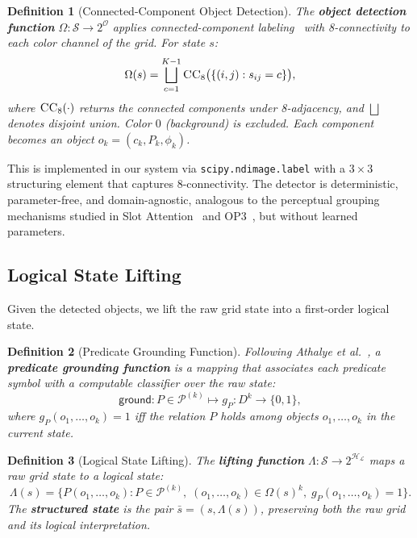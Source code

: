 \documentclass{article}
\newtheorem{definition}{Definition}
\newcommand{\calS}{\mathcal{S}}
\newcommand{\calO}{\mathcal{O}}
\newcommand{\calH}{\mathcal{H}}
\newcommand{\calL}{\mathcal{L}}
\newcommand{\calP}{\mathcal{P}}
\begin{document}
\begin{definition}[Connected-Component Object Detection]
\label{def:cc_detect}
The \textbf{object detection function} $\Omega : \calS \to 2^{\calO}$ applies connected-component labeling~\cite{he2017connected} with 8-connectivity to each color channel of the grid.  For state $s$:
\begin{equation}
\Omega(s) = \bigsqcup_{c=1}^{K-1} \textsc{CC}_8\bigl(\{(i,j) : s_{ij} = c\}\bigr),
\end{equation}
where $\textsc{CC}_8(\cdot)$ returns the connected components under 8-adjacency, and $\bigsqcup$ denotes disjoint union.  Color $0$ (background) is excluded.  Each component becomes an object $o_k = (c_k, P_k, \phi_k)$.
\end{definition}

This is implemented in our system via \texttt{scipy.ndimage.label} with a $3 \times 3$ structuring element that captures 8-connectivity.  The detector is deterministic, parameter-free, and domain-agnostic, analogous to the perceptual grouping mechanisms studied in Slot Attention~\cite{locatello2020object} and OP3~\cite{veerapaneni2020entity}, but without learned parameters.

\subsection{Logical State Lifting}
\label{sec:lifting}

Given the detected objects, we lift the raw grid state into a first-order logical state.

\begin{definition}[Predicate Grounding Function]
\label{def:predicate_grounding}
Following Athalye et al.~\cite{athalye2024pixels}, a \textbf{predicate grounding function} is a mapping that associates each predicate symbol with a computable classifier over the raw state:
\begin{equation}
\label{eq:grounding}
\mathsf{ground} : P \in \calP^{(k)} \mapsto g_P : D^k \to \{0, 1\},
\end{equation}
where $g_P(o_1, \ldots, o_k) = 1$ iff the relation $P$ holds among objects $o_1, \ldots, o_k$ in the current state.
\end{definition}

\begin{definition}[Logical State Lifting]
\label{def:lifting}
The \textbf{lifting function} $\Lambda : \calS \to 2^{\calH_\calL}$ maps a raw grid state to a logical state:
\begin{equation}
\Lambda(s) = \{ P(o_1, \ldots, o_k) : P \in \calP^{(k)},\; (o_1, \ldots, o_k) \in \Omega(s)^k,\; g_P(o_1, \ldots, o_k) = 1 \}.
\end{equation}
The \textbf{structured state} is the pair $\bar{s} = (s, \Lambda(s))$, preserving both the raw grid and its logical interpretation.
\end{definition}
\end{document}
